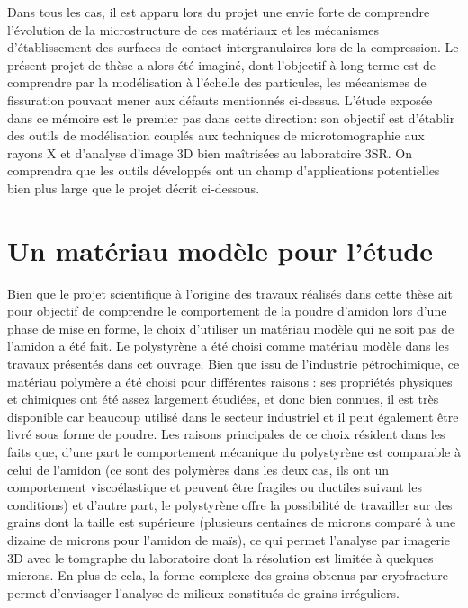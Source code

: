 Dans tous les cas, il est apparu lors du projet une envie forte de comprendre l'évolution de la microstructure de ces matériaux et les mécanismes d'établissement des surfaces de contact intergranulaires lors de la compression. Le présent projet de thèse a alors été imaginé, dont l'objectif à long terme est de comprendre par la modélisation à l'échelle des particules, les mécanismes de fissuration pouvant mener aux défauts mentionnés ci-dessus. L'étude exposée dans ce mémoire est le premier pas dans cette direction: son objectif est d'établir des outils de modélisation couplés aux techniques de microtomographie aux rayons X et d'analyse d'image 3D bien maîtrisées au laboratoire 3SR. On comprendra que les outils développés ont un champ d'applications potentielles bien plus large que le projet décrit ci-dessous.

\section*{Un matériau modèle pour l'étude}
Bien que le projet scientifique à l'origine des travaux réalisés dans cette thèse ait pour objectif de comprendre le comportement de la poudre d'amidon lors d'une phase de mise en forme, le choix d'utiliser un matériau modèle qui ne soit pas de l'amidon a été fait. Le polystyrène a été choisi comme matériau modèle dans les travaux présentés dans cet ouvrage. Bien que issu de l'industrie pétrochimique, ce matériau polymère a été choisi pour différentes raisons : ses propriétés physiques et chimiques ont été assez largement étudiées, et donc bien connues, il est très disponible car beaucoup utilisé dans le secteur industriel et il peut également être livré sous forme de poudre. Les raisons principales de ce choix résident dans les faits que, d'une part le comportement mécanique du polystyrène est comparable à celui de l'amidon (ce sont des polymères dans les deux cas, ils ont un comportement viscoélastique et peuvent être fragiles ou ductiles suivant les conditions) et d'autre part, le polystyrène offre la possibilité de travailler sur des grains dont la taille est supérieure (plusieurs centaines de microns comparé à une dizaine de microns pour l'amidon de maïs), ce qui permet l'analyse par imagerie 3D avec le tomgraphe du laboratoire dont la résolution est limitée à quelques microns. En plus de cela, la forme complexe des grains obtenus par cryofracture permet d'envisager l'analyse de milieux constitués de grains irréguliers.

